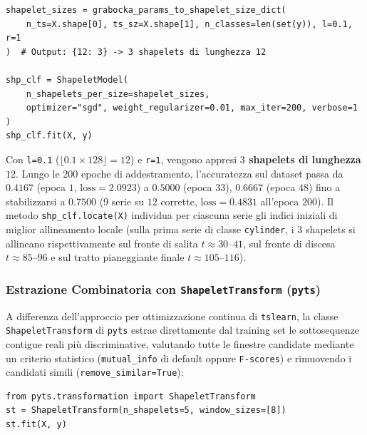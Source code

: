 \begin{lstlisting}[style=pythoncode, caption={Dimensionamento e addestramento di ShapeletModel con tslearn.}]
shapelet_sizes = grabocka_params_to_shapelet_size_dict(
    n_ts=X.shape[0], ts_sz=X.shape[1], n_classes=len(set(y)), l=0.1, r=1
)  # Output: {12: 3} -> 3 shapelets di lunghezza 12

shp_clf = ShapeletModel(
    n_shapelets_per_size=shapelet_sizes,
    optimizer="sgd", weight_regularizer=0.01, max_iter=200, verbose=1
)
shp_clf.fit(X, y)
\end{lstlisting}

Con \texttt{l=0.1} ($\lfloor 0.1 \times 128 \rfloor = 12$) e \texttt{r=1}, vengono appresi \textbf{$3$ shapelets di lunghezza $12$}. Lungo le $200$ epoche di addestramento, l'accuratezza sul dataset passa da $0.4167$ (epoca $1$, $\text{loss}=2.0923$) a $0.5000$ (epoca $33$), $0.6667$ (epoca $48$) fino a stabilizzarsi a \textbf{$0.7500$} ($9$ serie su $12$ corrette, $\text{loss}=0.4831$ all'epoca $200$). Il metodo \texttt{shp\_clf.locate(X)} individua per ciascuna serie gli indici iniziali di miglior allineamento locale (sulla prima serie di classe \texttt{cylinder}, i $3$ shapelets si allineano rispettivamente sul fronte di salita $t \approx 30\text{--}41$, sul fronte di discesa $t \approx 85\text{--}96$ e sul tratto pianeggiante finale $t \approx 105\text{--}116$).

\FloatBarrier
\subsubsection{Estrazione Combinatoria con \texttt{ShapeletTransform} (\texttt{pyts})}
\label{subsec:dm-lab-pyts}

A differenza dell'approccio per ottimizzazione continua di \texttt{tslearn}, la classe \texttt{ShapeletTransform} di \texttt{pyts} estrae direttamente dal training set le sottosequenze contigue reali pi\`u discriminative, valutando tutte le finestre candidate mediante un criterio statistico (\texttt{mutual\_info} di default oppure \texttt{F-scores}) e rimuovendo i candidati simili (\texttt{remove\_similar=True}):

\begin{lstlisting}[style=pythoncode, caption={Estrazione combinatoria di $5$ shapelets di lunghezza $8$ con pyts.}]
from pyts.transformation import ShapeletTransform
st = ShapeletTransform(n_shapelets=5, window_sizes=[8])
st.fit(X, y)
\end{lstlisting}

